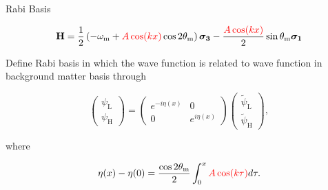 \begin{frame}{Rabi Basis}



\begin{tcolorbox}[title=Hamiltonian in Background Matter Basis]
    \begin{equation*}
    \mathbf {H} = \frac{1}{2}\left( - \omega_{\mathrm{m}} + {\color{red}A\cos(kx)} \cos 2\theta_{\mathrm{m}} \right) \boldsymbol{\sigma_3} - \frac{  {\color{red}A\cos (kx)}  }{2} \sin \theta_{\mathrm{m}} \boldsymbol{\sigma_1}
\end{equation*}
\end{tcolorbox}


\begin{tcolorbox}[title=A Better Basis]


Define Rabi basis %
in which the wave function is related to wave function in background matter basis
through

\begin{equation*}
    \begin{pmatrix}
    \psi_{\mathrm{L} } \\
    \psi_{\mathrm{H} }
    \end{pmatrix} = \begin{pmatrix}
     e^{-i \eta (x)} & 0 \\  0 & e^{i \eta (x)}
    \end{pmatrix}\begin{pmatrix}
    \tilde\psi_{\mathrm{L} }\\
    \tilde\psi_{\mathrm{H} }
    \end{pmatrix},
\end{equation*}

where

\begin{equation*}
    \eta(x) - \eta(0) = \frac{\cos 2\theta_{\mathrm{m}}}{2} \int_0^x {\color{red}A\cos(k \tau)} d\tau.
\end{equation*}

\end{tcolorbox}



\end{frame}














